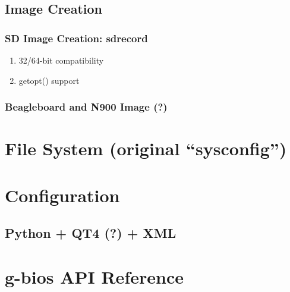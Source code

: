 \documentclass[a4paper,11pt]{book}
\begin{document}
\begin{CJK*}{UTF8}{gbsn}
\section{Image Creation}

\subsection{SD Image Creation: sdrecord}
\begin{enumerate}
\item 32/64-bit compatibility
\item getopt() support
\end{enumerate}

\subsection{Beagleboard and N900 Image (?)}

\chapter{File System (original ``sysconfig'')}

\chapter{Configuration}

\section{Python + QT4 (?) + XML}

\chapter{g-bios API Reference}


\clearpage
\end{CJK*}
\end{document}
